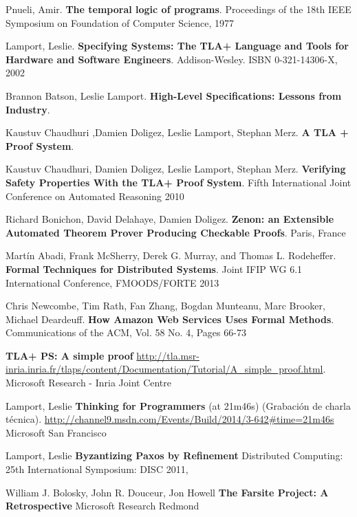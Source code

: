 \documentclass[spanish]{llncs}
\begin{document}
%
%
\begin{thebibliography}{5}
%
Pnueli, Amir.
\textbf{The temporal logic of programs}.
Proceedings of the 18th IEEE Symposium on Foundation of Computer Science, 1977

Lamport, Leslie.
\textbf{Specifying Systems: The TLA+ Language and Tools for Hardware and Software Engineers}.
Addison-Wesley. ISBN 0-321-14306-X, 2002

Brannon Batson, Leslie Lamport.
\textbf{High-Level Specifications: Lessons from Industry}.

Kaustuv Chaudhuri ,Damien Doligez, Leslie Lamport, Stephan Merz.
\textbf{A TLA + Proof System}.

Kaustuv Chaudhuri, Damien Doligez, Leslie Lamport, Stephan Merz.
\textbf{Verifying Safety Properties With the TLA+ Proof System}.
Fifth International Joint Conference on Automated Reasoning 2010

Richard Bonichon, David Delahaye, Damien Doligez.
\textbf{Zenon: an Extensible Automated Theorem Prover Producing Checkable Proofs}.
Paris, France

Martín Abadi, Frank McSherry, Derek G. Murray, and Thomas L. Rodeheffer.
\textbf{Formal Techniques for Distributed Systems}.
Joint IFIP WG 6.1 International Conference, FMOODS/FORTE 2013

Chris Newcombe, Tim Rath, Fan Zhang, Bogdan Munteanu, Marc Brooker, Michael Deardeuff. 
\textbf{How Amazon Web Services Uses Formal Methods}.
Communications of the ACM, Vol. 58 No. 4, Pages 66-73

\textbf{TLA+ PS: A simple proof}
\url{http://tla.msr-inria.inria.fr/tlaps/content/Documentation/Tutorial/A_simple_proof.html}.
Microsoft Research - Inria Joint Centre

Lamport, Leslie 
\textbf{Thinking for Programmers} (at 21m46s) (Grabación de charla técnica). 
\url{http://channel9.msdn.com/Events/Build/2014/3-642#time=21m46s}
Microsoft San Francisco

Lamport, Leslie
\textbf{Byzantizing Paxos by Refinement}
Distributed Computing: 25th International Symposium: DISC 2011,

William J. Bolosky, John R. Douceur, Jon Howell
\textbf{The Farsite Project: A Retrospective}
Microsoft Research Redmond

\end{thebibliography}

\clearpage
\end{document}
